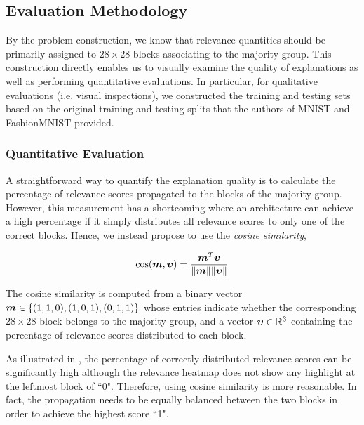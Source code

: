 \subsection{Evaluation Methodology}
\label{sec:evaluation_med}
By the problem construction, we know that relevance quantities should  be primarily assigned to $28\times28$ blocks associating to the majority group. This construction directly enables us to visually examine the quality of explanations as well as performing quantitative evaluations.  In particular, for qualitative evaluations (i.e. visual inspections), we constructed the training and testing sets based on the original training and testing splits that the authors of MNIST \citep{LeCunMNISThandwrittendigit2010} and FashionMNIST \citep{XiaoFashionMNISTNovelImage2017} provided.

\subsubsection{Quantitative Evaluation}
A straightforward way to quantify the explanation quality is to calculate the percentage of relevance scores propagated to the blocks of the majority group. However, this measurement has a shortcoming where an architecture can achieve a high percentage if it simply distributes all relevance scores to only one of the correct blocks. Hence, we instead propose to use the \textit{cosine similarity},


\begin{align*}
\cos (\patvector{m}, \patvector{\upsilon}) = \frac{ \patvector{m}^T \patvector{\upsilon}}{ \| \patvector{m}  \| \|\patvector{\upsilon}   \|}	
\end{align*}

The cosine similarity is computed from  a  binary  vector $\patvector{m} \in \{(1,1,0), (1,0,1), (0, 1, 1) \} $  whose entries indicate whether the corresponding $28\times28$ block belongs to the majority group, and a vector $\patvector{\upsilon} \in \mathbb{R}^3$ containing the percentage of  relevance scores distributed to each block. 


As illustrated in \addfigure{\ref{fig:quantitative_evaluation}}, the percentage of correctly distributed relevance scores can be significantly high although the relevance heatmap does not show any highlight at the leftmost block of ``0". Therefore, using cosine similarity is more reasonable. In fact, the propagation needs to be equally balanced between the two blocks in order to achieve the highest score ``1". 

